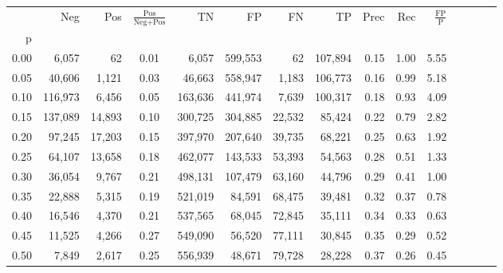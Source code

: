 \begin{tabular}{rrrcrrrrrrrrrrr}
\toprule
{} &      Neg &     Pos & $\frac{\text{Pos}}{\text{Neg}+\text{Pos}}$ &       TN &       FP &       FN &       TP &  Prec &   Rec & $\frac{\text{FP}}{\text{P}}$ \\
p    &          &         &                                            &          &          &          &          &       &       &                              \\
\midrule
0.00 &    6,057 &      62 &                                       0.01 &    6,057 &  599,553 &       62 &  107,894 &  0.15 &  1.00 &                         5.55 \\
0.05 &   40,606 &   1,121 &                                       0.03 &   46,663 &  558,947 &    1,183 &  106,773 &  0.16 &  0.99 &                         5.18 \\
0.10 &  116,973 &   6,456 &                                       0.05 &  163,636 &  441,974 &    7,639 &  100,317 &  0.18 &  0.93 &                         4.09 \\
0.15 &  137,089 &  14,893 &                                       0.10 &  300,725 &  304,885 &   22,532 &   85,424 &  0.22 &  0.79 &                         2.82 \\
0.20 &   97,245 &  17,203 &                                       0.15 &  397,970 &  207,640 &   39,735 &   68,221 &  0.25 &  0.63 &                         1.92 \\
0.25 &   64,107 &  13,658 &                                       0.18 &  462,077 &  143,533 &   53,393 &   54,563 &  0.28 &  0.51 &                         1.33 \\
0.30 &   36,054 &   9,767 &                                       0.21 &  498,131 &  107,479 &   63,160 &   44,796 &  0.29 &  0.41 &                         1.00 \\
0.35 &   22,888 &   5,315 &                                       0.19 &  521,019 &   84,591 &   68,475 &   39,481 &  0.32 &  0.37 &                         0.78 \\
0.40 &   16,546 &   4,370 &                                       0.21 &  537,565 &   68,045 &   72,845 &   35,111 &  0.34 &  0.33 &                         0.63 \\
0.45 &   11,525 &   4,266 &                                       0.27 &  549,090 &   56,520 &   77,111 &   30,845 &  0.35 &  0.29 &                         0.52 \\
0.50 &    7,849 &   2,617 &                                       0.25 &  556,939 &   48,671 &   79,728 &   28,228 &  0.37 &  0.26 &                         0.45 \\

\end{tabular}
